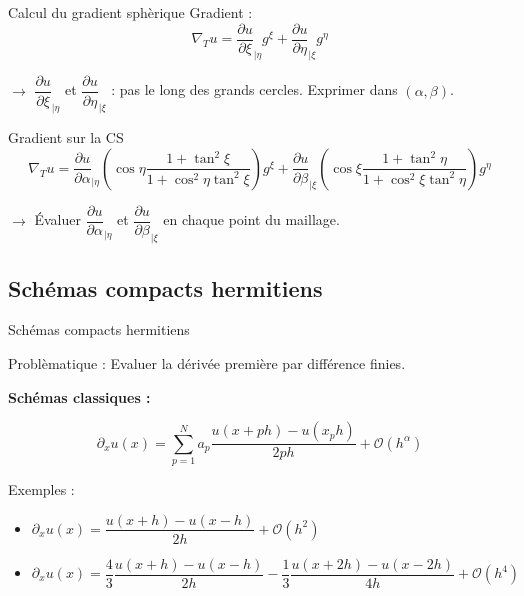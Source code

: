 \documentclass[11pt]{beamer}
\begin{document}
\begin{frame}{Calcul du gradient sphèrique}
Gradient :
$$\nabla_T u = \dfrac{\partial u}{\partial \xi}_{|\eta} g^\xi + \dfrac{\partial u}{\partial \eta}_{|\xi} g^\eta $$

$\rightarrow$ $\dfrac{\partial u}{\partial \xi}_{|\eta}$ et $\dfrac{\partial u}{\partial \eta}_{|\xi}$ : pas le long des grands cercles. Exprimer dans $(\alpha, \beta)$.
\pause
\begin{block}{Gradient sur la CS}
$$\nabla_T u = \frac{\partial u}{\partial \alpha}_{|\eta} \left( \cos \eta \dfrac{1+ \tan^2 \xi}{1 + \cos^2 \eta \tan^2 \xi} \right) g^\xi + \frac{\partial u}{\partial \beta}_{|\xi} \left( \cos \xi \dfrac{1+ \tan^2 \eta}{1 + \cos^2 \xi \tan^2 \eta} \right) g^\eta $$
\end{block}
\pause
$\rightarrow$ Évaluer $\dfrac{\partial u}{\partial \alpha}_{|\eta}$ et $\dfrac{\partial u}{\partial \beta}_{|\xi}$ en chaque point du maillage.
\end{frame}



\subsection{Schémas compacts hermitiens}

\begin{frame}{Schémas compacts hermitiens}
\begin{exampleblock}{Problèmatique :}
Evaluer la dérivée première par différence finies.
\end{exampleblock}

\pause

\textbf{Schémas classiques :}

$$\partial_x u(x) = \sum_{p=1}^N a_p \dfrac{ u(x+ph) - u(x_ph)}{2ph} +
\mathcal{O}\left( h^{\alpha} \right)$$

Exemples :
\begin{itemize}
\item $\partial_x u(x) = \dfrac{u(x+h) - u(x-h)}{2h} +
  \mathcal{O}(h^2)$
\item  $\partial_x u(x) = \dfrac{4}{3}\dfrac{u(x+h) - u(x-h)}{2h} - \dfrac{1}{3}\dfrac{u(x+2h) - u(x-2h)}{4h} + \mathcal{O}(h^4)$
\end{itemize}

\end{frame}
\end{document}
